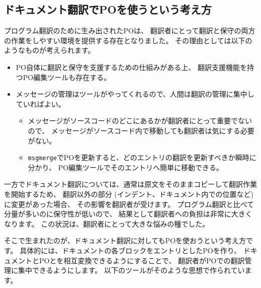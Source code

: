 \documentclass[mingoth,a4paper]{jsarticle}
\begin{document}
\subsection{ドキュメント翻訳でPOを使うという考え方}

プログラム翻訳のために生み出されたPOは、
翻訳者にとって翻訳と保守の両方の作業をしやすい環境を提供する存在となりました。
その理由としては以下のようなものが考えられます。

\begin{itemize}
 \item PO自体に翻訳と保守を支援するための仕組みがある上、
       翻訳支援機能を持つPO編集ツールも存在する。
 \item メッセージの管理はツールがやってくれるので、人間は翻訳の管理に集中していればよい。
       \begin{itemize}
	\item メッセージがソースコードのどこにあるかが翻訳者にとって重要でないので、
	      メッセージがソースコード内で移動しても翻訳者は気にする必要がない。
	\item \texttt{msgmerge}でPOを更新すると、どのエントリの翻訳を更新すべきか瞬時に分かり、
	      PO編集ツールでそのエントリへ簡単に移動できる。
       \end{itemize}
\end{itemize}

一方でドキュメント翻訳については、通常は原文をそのままコピーして翻訳作業を開始するため、
翻訳以外の部分 (インデント、ドキュメント内での位置など) に変更があった場合、
その影響を翻訳者が受けます。
プログラム翻訳と比べて分量が多いのに保守性が低いので、
結果として翻訳者への負担は非常に大きくなります。
この状況は、翻訳者にとって大きな悩みの種でした。

そこで生まれたのが、ドキュメント翻訳に対してもPOを使おうという考え方です。
具体的には、ドキュメントの各ブロックをエントリとしたPOを作り、
ドキュメントとPOとを相互変換できるようにすることで、
翻訳者がPOでの翻訳管理に集中できるようにします。
以下のツールがそのような思想で作られています。
\end{document}
